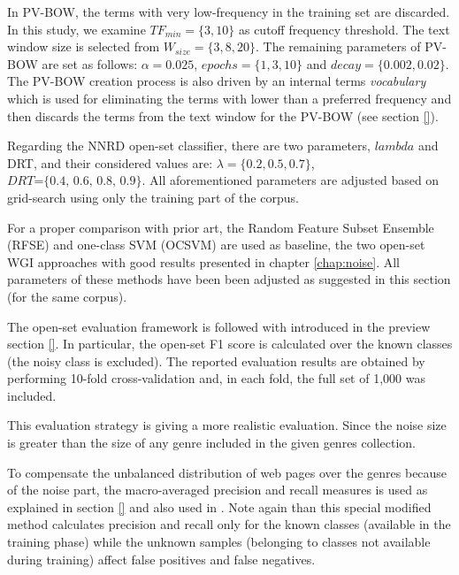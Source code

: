 In PV-BOW, the terms with very low-frequency in the training set are discarded. In this study, we examine $TF_{min}=\{3,10\}$ as cutoff frequency threshold. The text window size is selected from $W_{size}=\{3,8,20\}$. The remaining parameters of PV-BOW are set as follows: $\alpha=0.025$, $epochs=\{1, 3, 10\}$ and $decay=\{0.002, 0.02\}$. The PV-BOW creation process is also driven by an internal terms \textit{vocabulary} which is used for eliminating the terms with lower than a preferred frequency and then discards the terms from the text window for the PV-BOW (see section \ref{}).


Regarding the NNRD open-set classifier, there are two parameters, $lambda$ and DRT, and their considered values are: $\lambda =\{0.2, 0.5, 0.7\}$, $DRT\textit{=\{0.4, 0.6, 0.8, 0.9\}}$. All aforementioned parameters are adjusted based on grid-search using only the training part of the corpus.

For a proper comparison with prior art, the Random Feature Subset Ensemble (RFSE) and one-class SVM (OCSVM) \parencite{pritsos2013open,pritsos2018open} are used as baseline, the two open-set WGI approaches with good results presented in chapter \ref{chap:noise}. All parameters of these methods have been been adjusted as suggested in this section (for the same corpus).

The open-set evaluation framework is followed with  introduced in the preview section \ref{}. In particular, the open-set F1 score \parencite{mendesjunior2016} is calculated over the known classes (the noisy class is excluded). The reported evaluation results are obtained by performing 10-fold cross-validation and, in each fold, the full set of 1,000  was included. 

This evaluation strategy is giving a more realistic evaluation. Since the noise size is greater than the size of any genre included in the given genres collection.

To compensate the unbalanced distribution of web pages over the genres because of the noise part, the macro-averaged precision and recall measures is used as explained in section \ref{} and also used in \parencite{mendesjunior2016}. Note again than this special modified method calculates precision and recall only for the known classes (available in the training phase) while the unknown samples (belonging to classes not available during training) affect false positives and false negatives. 

